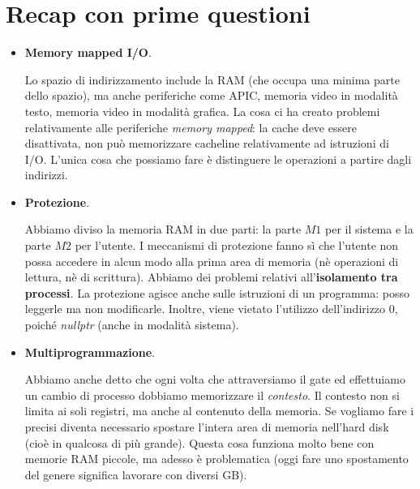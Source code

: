 \documentclass[11pt]{report}
\theoremstyle{definition}
\begin{document}
\section{Recap con prime questioni}
\begin{itemize}
	\item \textbf{Memory mapped I/O}. 
	
	Lo spazio di indirizzamento include la RAM (che occupa una minima parte dello spazio), ma anche periferiche come APIC, memoria video in modalità testo, memoria video in modalità grafica. La cosa ci ha creato problemi relativamente alle periferiche \emph{memory mapped}: la cache deve essere disattivata, non può memorizzare cacheline relativamente ad istruzioni di I/O. L'unica cosa che possiamo fare è distinguere le operazioni a partire dagli indirizzi.
	\item \textbf{Protezione}. 
	
	Abbiamo diviso la memoria RAM in due parti: la parte $M1$ per il sistema e la parte $M2$ per l'utente. I meccanismi di protezione fanno sì che l'utente non possa accedere in alcun modo alla prima area di memoria (nè operazioni di lettura, nè di scrittura).  Abbiamo dei problemi relativi all'\textbf{isolamento tra processi}. La protezione agisce anche sulle istruzioni di un programma: posso leggerle ma non modificarle. Inoltre, viene vietato l'utilizzo dell'indirizzo $0$, poiché \emph{nullptr} (anche in modalità sistema).
	\item \textbf{Multiprogrammazione}. 
	
	Abbiamo anche detto che ogni volta che attraversiamo il gate ed effettuiamo un cambio di processo dobbiamo memorizzare il \emph{contesto}. Il contesto non si limita ai soli registri, ma anche al contenuto della memoria. Se vogliamo fare i precisi diventa necessario spostare l'intera area di memoria nell'hard disk (cioè in qualcosa di più grande). Questa cosa funziona molto bene con memorie RAM piccole, ma adesso è problematica (oggi fare uno spostamento del genere significa lavorare con diversi GB).
\end{itemize} 
\clearpage 
\end{document}
